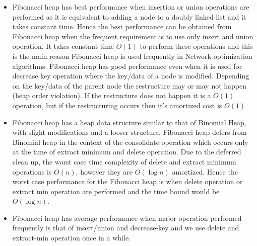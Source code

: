\begin{itemize}
	\item Fibonacci heap has best performance when insertion or union operations are performed as it is equivalent to adding a node to a doubly linked list and it takes constant time. Hence the best performance can be obtained from Fibonacci heap when the frequent requirement is to use only insert and union operation. It takes constant time $O(1)$ to perform these operations and this is the main reason Fibonacci heap is used frequently in Network optimization algorithms. Fibonacci heap has good performance even when it is used for decrease key operation where the key/data of a node is modified. Depending on the key/data of the parent node the restructure may or may not happen (heap order violation). If the restructure does not happen it is a $O(1)$ operation, but if the restructuring occurs then it's amortized cost is $O(1)$
	\item Fibonacci heap has a heap data structure similar to that of Binomial Heap, with slight modifications and a looser structure. Fibonacci heap defers from Binomial heap in the context of the consolidate operation which occurs only at the time of extract minimum and delete operation. Due to the deferred clean up, the worst case time complexity of delete and extract minimum operations is $O(n)$, however they are $O(\log{n})$ amortized. Hence the worst case performance for the Fibonacci heap is when delete operation or extract min operation are performed and the time bound would be $O(\log{n})$. 
	\item Fibonacci heap has average performance when major operation performed frequently is that of insert/union and decrease-key and we use delete and extract-min operation once in a while.
\end{itemize} 


